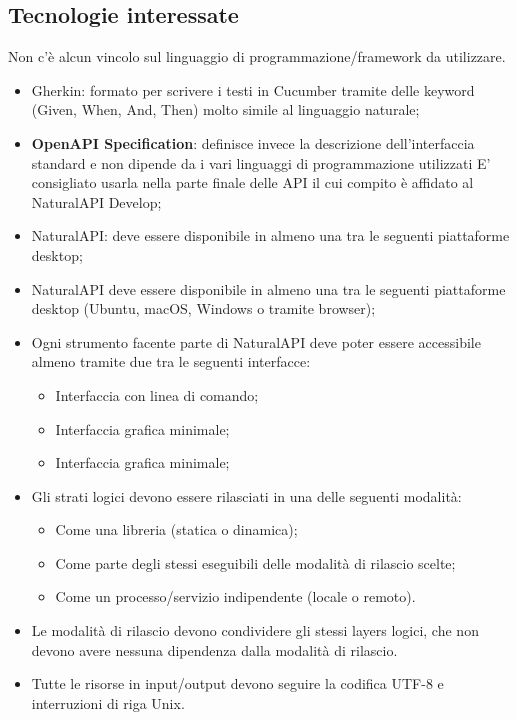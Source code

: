 \subsection{Tecnologie interessate}
Non c’è alcun vincolo sul linguaggio di programmazione/framework da utilizzare. 
\begin{itemize}
	\item Gherkin: formato per scrivere i testi in Cucumber tramite delle keyword (Given, When, And, Then) molto simile al linguaggio naturale; 
	\item \textbf{OpenAPI Specification}: definisce invece la descrizione dell’interfaccia standard e non dipende da i vari linguaggi di programmazione utilizzati E’ consigliato usarla nella parte finale delle API il cui compito è affidato al NaturalAPI Develop;
	\item NaturalAPI: deve essere disponibile in almeno una tra le seguenti piattaforme desktop;
	\item NaturalAPI deve essere disponibile in almeno una tra le seguenti piattaforme desktop (Ubuntu, macOS, Windows o tramite browser);
	\item Ogni strumento facente parte di NaturalAPI deve poter essere accessibile almeno tramite due tra le seguenti interfacce: 
	\begin{itemize}
		\item Interfaccia con linea di comando;
		\item Interfaccia grafica minimale;
		\item Interfaccia grafica minimale;
	\end{itemize}
	\item Gli strati logici devono essere rilasciati in una delle seguenti modalità:
	\begin{itemize}
		\item Come una libreria (statica o dinamica);
		\item Come parte degli stessi eseguibili delle modalità di rilascio scelte; 
		\item Come un processo/servizio indipendente (locale o remoto).
	\end{itemize}
	\item Le modalità di rilascio devono condividere gli stessi layers logici, che non devono avere nessuna dipendenza dalla modalità di rilascio.
	\item Tutte le risorse in input/output devono seguire la codifica UTF-8 e interruzioni di riga Unix.

\end{itemize}

